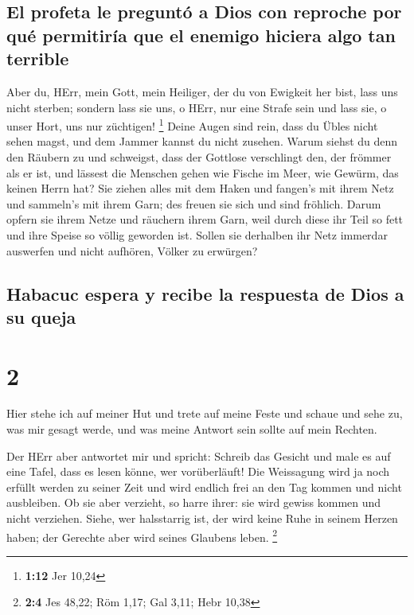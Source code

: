 \hypertarget{el-profeta-le-preguntuxf3-a-dios-con-reproche-por-quuxe9-permitiruxeda-que-el-enemigo-hiciera-algo-tan-terrible}{%
\subsection{El profeta le preguntó a Dios con reproche por qué
permitiría que el enemigo hiciera algo tan
terrible}\label{el-profeta-le-preguntuxf3-a-dios-con-reproche-por-quuxe9-permitiruxeda-que-el-enemigo-hiciera-algo-tan-terrible}}

 Aber du, HErr, mein Gott, mein Heiliger, der du von
Ewigkeit her bist, lass uns nicht sterben; sondern lass sie uns, o HErr,
nur eine Strafe sein und lass sie, o unser Hort, uns nur züchtigen!
\footnote{\textbf{1:12} Jer 10,24}  Deine Augen sind
rein, dass du Übles nicht sehen magst, und dem Jammer kannst du nicht
zusehen. Warum siehst du denn den Räubern zu und schweigst, dass der
Gottlose verschlingt den, der frömmer als er ist,  und
lässest die Menschen gehen wie Fische im Meer, wie Gewürm, das keinen
Herrn hat?  Sie ziehen alles mit dem Haken und fangen's
mit ihrem Netz und sammeln's mit ihrem Garn; des freuen sie sich und
sind fröhlich.  Darum opfern sie ihrem Netze und räuchern
ihrem Garn, weil durch diese ihr Teil so fett und ihre Speise so völlig
geworden ist.  Sollen sie derhalben ihr Netz immerdar
auswerfen und nicht aufhören, Völker zu erwürgen?

\hypertarget{habacuc-espera-y-recibe-la-respuesta-de-dios-a-su-queja}{%
\subsection{Habacuc espera y recibe la respuesta de Dios a su
queja}\label{habacuc-espera-y-recibe-la-respuesta-de-dios-a-su-queja}}

\hypertarget{section-1}{%
\section{2}\label{section-1}}

 Hier stehe ich auf meiner Hut und trete auf meine Feste
und schaue und sehe zu, was mir gesagt werde, und was meine Antwort sein
sollte auf mein Rechten.

 Der HErr aber antwortet mir und spricht: Schreib das
Gesicht und male es auf eine Tafel, dass es lesen könne, wer
vorüberläuft!  Die Weissagung wird ja noch erfüllt werden
zu seiner Zeit und wird endlich frei an den Tag kommen und nicht
ausbleiben. Ob sie aber verzieht, so harre ihrer: sie wird gewiss kommen
und nicht verziehen.  Siehe, wer halsstarrig ist, der wird
keine Ruhe in seinem Herzen haben; der Gerechte aber wird seines
Glaubens leben. \footnote{\textbf{2:4} Jes 48,22; Röm 1,17; Gal 3,11;
  Hebr 10,38}

